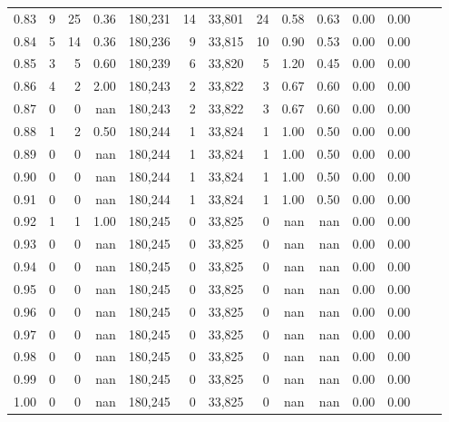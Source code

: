 \begin{tabular}{rrrrrrrrrrrrrr}
0.83 &      9 &     25 &    0.36 &  180,231 &       14 &  33,801 &      24 &  0.58 &  0.63 &  0.00 &      0.00 \\
0.84 &      5 &     14 &    0.36 &  180,236 &        9 &  33,815 &      10 &  0.90 &  0.53 &  0.00 &      0.00 \\
0.85 &      3 &      5 &    0.60 &  180,239 &        6 &  33,820 &       5 &  1.20 &  0.45 &  0.00 &      0.00 \\
0.86 &      4 &      2 &    2.00 &  180,243 &        2 &  33,822 &       3 &  0.67 &  0.60 &  0.00 &      0.00 \\
0.87 &      0 &      0 &     nan &  180,243 &        2 &  33,822 &       3 &  0.67 &  0.60 &  0.00 &      0.00 \\
0.88 &      1 &      2 &    0.50 &  180,244 &        1 &  33,824 &       1 &  1.00 &  0.50 &  0.00 &      0.00 \\
0.89 &      0 &      0 &     nan &  180,244 &        1 &  33,824 &       1 &  1.00 &  0.50 &  0.00 &      0.00 \\
0.90 &      0 &      0 &     nan &  180,244 &        1 &  33,824 &       1 &  1.00 &  0.50 &  0.00 &      0.00 \\
0.91 &      0 &      0 &     nan &  180,244 &        1 &  33,824 &       1 &  1.00 &  0.50 &  0.00 &      0.00 \\
0.92 &      1 &      1 &    1.00 &  180,245 &        0 &  33,825 &       0 &   nan &   nan &  0.00 &      0.00 \\
0.93 &      0 &      0 &     nan &  180,245 &        0 &  33,825 &       0 &   nan &   nan &  0.00 &      0.00 \\
0.94 &      0 &      0 &     nan &  180,245 &        0 &  33,825 &       0 &   nan &   nan &  0.00 &      0.00 \\
0.95 &      0 &      0 &     nan &  180,245 &        0 &  33,825 &       0 &   nan &   nan &  0.00 &      0.00 \\
0.96 &      0 &      0 &     nan &  180,245 &        0 &  33,825 &       0 &   nan &   nan &  0.00 &      0.00 \\
0.97 &      0 &      0 &     nan &  180,245 &        0 &  33,825 &       0 &   nan &   nan &  0.00 &      0.00 \\
0.98 &      0 &      0 &     nan &  180,245 &        0 &  33,825 &       0 &   nan &   nan &  0.00 &      0.00 \\
0.99 &      0 &      0 &     nan &  180,245 &        0 &  33,825 &       0 &   nan &   nan &  0.00 &      0.00 \\
1.00 &      0 &      0 &     nan &  180,245 &        0 &  33,825 &       0 &   nan &   nan &  0.00 &      0.00 \\
\bottomrule
\end{tabular}
